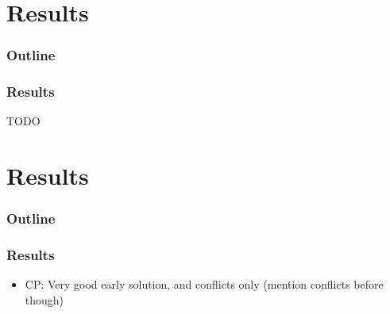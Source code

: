 \documentclass{beamer}
\newcommand{\AutoSectionTitle}{}
\begin{document}


\renewcommand{\AutoSectionTitle}{Results}

\section{\AutoSectionTitle}

\begin{frame}
  \frametitle{Outline}
  \tableofcontents[currentsection]
\end{frame}




\begin{frame}
  \frametitle{\AutoSectionTitle}

  TODO
  
\end{frame}




\renewcommand{\AutoSectionTitle}{Results}

\section{\AutoSectionTitle}

\begin{frame}
  \frametitle{Outline}
  \tableofcontents[currentsection]
\end{frame}




\begin{frame}
  \frametitle{\AutoSectionTitle}

  \begin{itemize}
    \item CP: Very good early solution, and conflicts only (mention conflicts before though)
  \end{itemize}


  
\end{frame}


\end{document}
